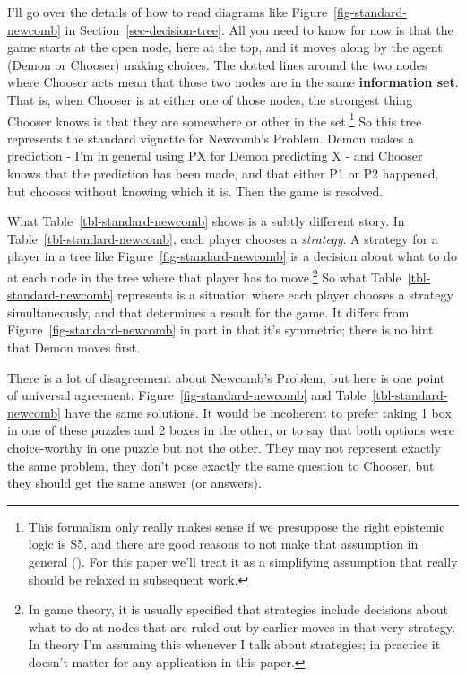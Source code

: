 \documentclass[
  11pt,
  letterpaper,
  DIV=11,
  numbers=noendperiod,
  twoside]{scrartcl}
\begin{document}
I'll go over the details of how to read diagrams like
Figure~\ref{fig-standard-newcomb} in Section~\ref{sec-decision-tree}.
All you need to know for now is that the game starts at the open node,
here at the top, and it moves along by the agent (Demon or Chooser)
making choices. The dotted lines around the two nodes where Chooser acts
mean that those two nodes are in the same \textbf{information set}. That
is, when Chooser is at either one of those nodes, the strongest thing
Chooser knows is that they are somewhere or other in the set.\footnote{This
  formalism only really makes sense if we presuppose the right epistemic
  logic is S5, and there are good reasons to not make that assumption in
  general ().
  For this paper we'll treat it as a simplifying assumption that really
  should be relaxed in subsequent work.} So this tree represents the
standard vignette for Newcomb's Problem. Demon makes a prediction - I'm
in general using PX for Demon predicting X - and Chooser knows that the
prediction has been made, and that either P1 or P2 happened, but chooses
without knowing which it is. Then the game is resolved.

What Table~\ref{tbl-standard-newcomb} shows is a subtly different story.
In Table~\ref{tbl-standard-newcomb}, each player chooses a
\emph{strategy}. A strategy for a player in a tree like
Figure~\ref{fig-standard-newcomb} is a decision about what to do at each
node in the tree where that player has to move.\footnote{In game theory,
  it is usually specified that strategies include decisions about what
  to do at nodes that are ruled out by earlier moves in that very
  strategy. In theory I'm assuming this whenever I talk about
  strategies; in practice it doesn't matter for any application in this
  paper.} So what Table~\ref{tbl-standard-newcomb} represents is a
situation where each player chooses a strategy simultaneously, and that
determines a result for the game. It differs from
Figure~\ref{fig-standard-newcomb} in part in that it's symmetric; there
is no hint that Demon moves first.

There is a lot of disagreement about Newcomb's Problem, but here is one
point of universal agreement: Figure~\ref{fig-standard-newcomb} and
Table~\ref{tbl-standard-newcomb} have the same solutions. It would be
incoherent to prefer taking 1 box in one of these puzzles and 2 boxes in
the other, or to say that both options were choice-worthy in one puzzle
but not the other. They may not represent exactly the same problem, they
don't pose exactly the same question to Chooser, but they should get the
same answer (or answers).
\end{document}
